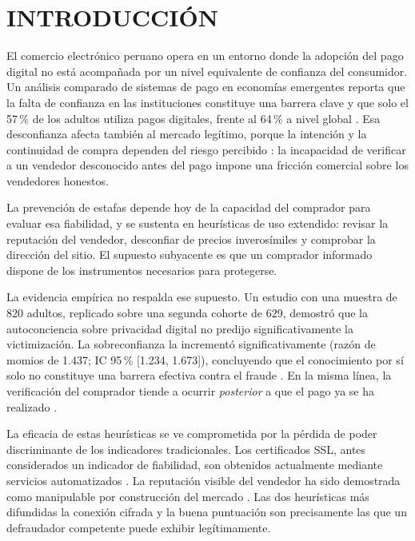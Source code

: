 
\section{INTRODUCCIÓN}

El comercio electrónico peruano opera en un entorno donde la adopción del pago digital no está
acompañada por un nivel equivalente de confianza del consumidor. Un análisis comparado de
sistemas de pago en economías emergentes reporta que la falta de confianza en las
instituciones constituye una barrera clave y que solo el 57\,\% de los adultos utiliza pagos
digitales, frente al 64\,\% a nivel global \cite{ref26}. Esa desconfianza afecta también al
mercado legítimo, porque la intención y la continuidad de compra dependen del riesgo percibido
\cite{ref21, ref6}: la incapacidad de verificar a un vendedor desconocido antes del pago
impone una fricción comercial sobre los vendedores honestos.

La prevención de estafas depende hoy de la capacidad del comprador para evaluar esa
fiabilidad, y se sustenta en heurísticas de uso extendido: revisar la reputación del vendedor,
desconfiar de precios inverosímiles y comprobar la dirección del sitio. El supuesto subyacente
es que un comprador informado dispone de los instrumentos necesarios para protegerse.

La evidencia empírica no respalda ese supuesto. Un estudio con una muestra de 820 adultos,
replicado sobre una segunda cohorte de 629, demostró que la autoconciencia sobre privacidad
digital no predijo significativamente la victimización. La sobreconfianza la incrementó
significativamente (razón de momios de 1.437; IC 95\,\% [1.234, 1.673]),
concluyendo que el conocimiento por sí solo no constituye una barrera efectiva contra el
fraude \cite{ref27}. En la misma línea, la verificación del comprador tiende a ocurrir
\emph{posterior} a que el pago ya se ha realizado \cite{ref3}.

La eficacia de estas heurísticas se ve comprometida por la pérdida de poder discriminante
de los indicadores tradicionales. Los certificados SSL, antes considerados un indicador de
fiabilidad, son obtenidos actualmente mediante servicios automatizados \cite{ref25}. La
reputación visible del vendedor ha sido demostrada como manipulable por construcción del
mercado \cite{ref29}. Las dos heurísticas más difundidas la conexión cifrada y la buena
puntuación son precisamente las que un defraudador competente puede exhibir legítimamente.

